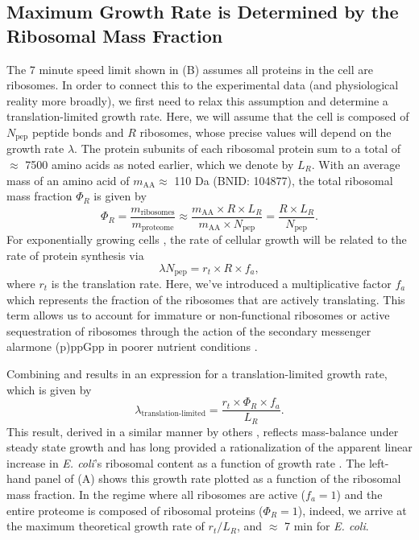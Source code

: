 \subsection{Maximum Growth Rate is Determined by the Ribosomal Mass Fraction}
\label{sec:limit}
The 7 minute speed limit shown in (B) assumes all
proteins in the cell are ribosomes. In order to connect this to the
experimental data (and physiological reality more broadly), we first need to relax this assumption and determine a
translation-limited growth rate. Here, we will assume that the cell is composed
of $N_\text{pep}$ peptide bonds and $R$ ribosomes, whose precise values will depend on the
growth rate $\lambda$. The protein subunits of each ribosomal protein sum to a
total of $\approx$ 7500 amino acids as noted earlier, which we denote by $L_R$.
With an average mass of an amino acid of $m_\text{AA} \approx$ 110
Da (BNID: 104877), the total ribosomal mass fraction  $\Phi_R$ is given by
\begin{equation}
  \Phi_R = \frac{m_\text{ribosomes} }{m_\text{proteome}} \approx \frac{m_\text{AA} \times R \times L_R}{m_\text{AA} \times N_\text{pep}} = \frac{R \times L_R}{N_\text{pep}}.
  \label{eq:phir}
\end{equation}
For exponentially growing cells \citep{godin2010}, the rate of cellular growth will
be related to the rate of protein synthesis via
\begin{equation}
  \lambda N_\text{pep} = r_t \times R \times f_a,
  \label{eq:lam_npep}
\end{equation}
where $r_t$ is the translation rate. Here, we've introduced a multiplicative
factor $f_a$ which represents the fraction of the ribosomes that are actively
translating. This term allows us to account for immature or
non-functional ribosomes or active sequestration of ribosomes through the action
of the secondary messenger alarmone (p)ppGpp in poorer nutrient conditions \citep{hauryliuk2015}.

Combining  and  results in an expression for a
translation-limited growth rate, which is given by
\begin{equation}
\lambda_\text{translation-limited} = \frac{r_t\times \Phi_R\times f_a}{L_R}.
\label{eq:lam_limited}
\end{equation}
This result, derived in a similar manner by others \citep{dennis2004, klumpp2013}, reflects
mass-balance under steady state growth and has long provided a rationalization
of the apparent linear increase in \textit{E. coli}'s ribosomal content as a
function of growth rate \citep{goldberger1979, dennis2004, scott2010, dai2016}. The
left-hand panel of (A) shows this growth rate plotted as a
function of the ribosomal mass fraction.  In the regime where all ribosomes are
active ($f_a = 1$) and the entire proteome is composed of ribosomal proteins
($\Phi_R = 1$), indeed, we arrive at the maximum theoretical growth rate of $r_t
/ L_R$, and $\approx$ 7 min for \textit{E. coli}.

